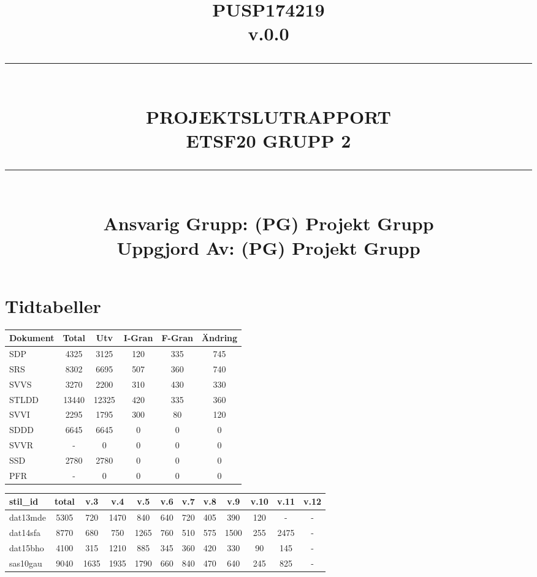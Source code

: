 \documentclass[paper=a4, fontsize=11pt,twoside]{article}
\title{
		\documentNumber{#1}																						
		\documentVersion{#2}																				
		\HRule{0.5pt} \\ %
		\LARGE \textbf{\uppercase{#3}} \\
		\large \textbf{\uppercase{ETSF20 Grupp 2}} 
		\HRule{2pt} \\ [1.5cm]    
		\normalsize            
		\documentResponsible{#4} \\ 
		\documentCreator{#4}  
	}
\newcommand{\HRule}[1]{\rule{\linewidth}{#1}}
\newcommand{\documentNumber}[1]{\centering PUSP1742#1 \\[1.0cm]}
\newcommand{\documentVersion}[1]{\centering \small{v.#1} \\[1.0cm]}
\newcommand{\documentResponsible}[1]{\centering  Ansvarig Grupp: #1}
\newcommand{\documentCreator}[1]{\centering Uppgjord Av: #1}
\newcommand{\grouptitlepage}[4]{ 
	\title{
		\documentNumber{#1}																						
		\documentVersion{#2}																				
		\HRule{0.5pt} \\ %
		\LARGE \textbf{\uppercase{#3}} \\
		\large \textbf{\uppercase{ETSF20 Grupp 2}} 
		\HRule{2pt} \\ [1.5cm]    
		\normalsize            
		\documentResponsible{#4} \\ 
		\documentCreator{#4}  
	}																							
	\maketitle																							
	\thispagestyle{empty} 																					
	\newpage 
}
\begin{document}
\grouptitlepage
{19}
{0.0}
{Projektslutrapport}
{(PG) Projekt Grupp}
\tableofcontents

\section{Tidtabeller}
\begin{tabular}{|l|c|c|c|c|c|}
\hline
\textbf{Dokument} & \textbf{Total} & \textbf{Utv} & \textbf{I-Gran} &
\textbf{F-Gran} & \textbf{Ändring}\\
\hline
SDP & 4325 & 3125 & 120 & 335 & 745\\
\hline
SRS & 8302 & 6695 & 507 & 360 & 740\\
\hline
SVVS & 3270 & 2200 & 310 & 430 & 330\\
\hline
STLDD & 13440 & 12325 & 420 & 335 & 360\\
\hline
SVVI & 2295 & 1795 & 300 & 80 & 120\\
\hline
SDDD & 6645 & 6645 & 0 & 0 & 0\\
\hline
SVVR & - & 0 & 0 & 0 & 0\\
\hline
SSD & 2780 & 2780 & 0 & 0 & 0\\
\hline
PFR & - & 0 & 0 & 0 & 0\\
\hline
\end{tabular}

\begin{tabular}{|l|c|c|c|c|c|c|c|c|c|c|c|}
\hline
{\fontsize{8pt}{0.2cm}\selectfont stil\_id} & {\fontsize{8pt}{0.2cm}\selectfont
total} & {\fontsize{8pt}{0.2cm}\selectfont v.3} &
{\fontsize{8pt}{0.2cm}\selectfont v.4} & {\fontsize{8pt}{0.2cm}\selectfont v.5}
& {\fontsize{8pt}{0.2cm}\selectfont v.6} & {\fontsize{8pt}{0.2cm}\selectfont v.7}
& {\fontsize{8pt}{0.2cm}\selectfont v.8} & {\fontsize{8pt}{0.2cm}\selectfont v.9}
& {\fontsize{8pt}{0.2cm}\selectfont v.10} & {\fontsize{8pt}{0.2cm}\selectfont
v.11} & {\fontsize{8pt}{0.2cm}\selectfont v.12} \\
\hline
dat13mde & 5305 & 720 & 1470 & 840 & 640 & 720 & 405 & 390 & 120 & - & - \\
\hline
dat14sfa & 8770 & 680 & 750 & 1265 & 760 & 510 & 575 & 1500 & 255 & 2475 & - \\
\hline
dat15bho & 4100 & 315 & 1210 & 885 & 345 & 360 & 420 & 330 & 90 & 145 & - \\
\hline
sas10gau & 9040 & 1635 & 1935 & 1790 & 660 & 840 & 470 & 640 & 245 & 825 & -\\
\hline
\end{tabular}
\end{document}

